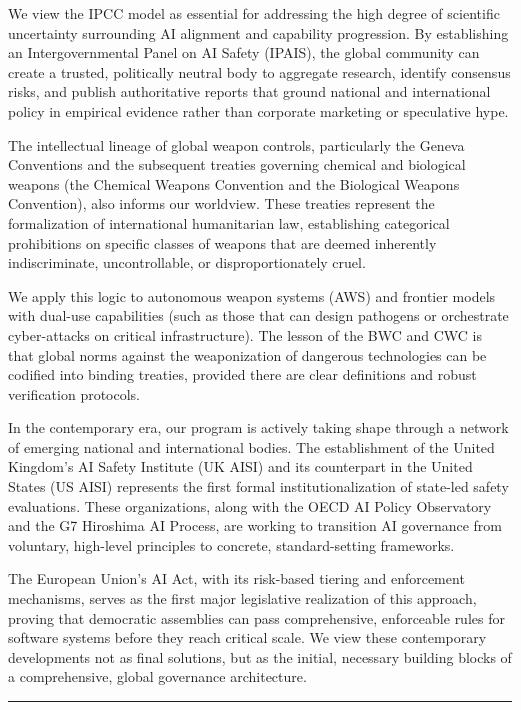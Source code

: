 We view the IPCC model as essential for addressing the high degree of
scientific uncertainty surrounding AI alignment and capability
progression. By establishing an Intergovernmental Panel on AI Safety
(IPAIS), the global community can create a trusted, politically neutral
body to aggregate research, identify consensus risks, and publish
authoritative reports that ground national and international policy in
empirical evidence rather than corporate marketing or speculative hype.

The intellectual lineage of global weapon controls, particularly the
Geneva Conventions and the subsequent treaties governing chemical and
biological weapons (the Chemical Weapons Convention and the Biological
Weapons Convention), also informs our worldview. These treaties
represent the formalization of international humanitarian law,
establishing categorical prohibitions on specific classes of weapons
that are deemed inherently indiscriminate, uncontrollable, or
disproportionately cruel.

We apply this logic to autonomous weapon systems (AWS) and frontier
models with dual-use capabilities (such as those that can design
pathogens or orchestrate cyber-attacks on critical infrastructure). The
lesson of the BWC and CWC is that global norms against the weaponization
of dangerous technologies can be codified into binding treaties,
provided there are clear definitions and robust verification protocols.

In the contemporary era, our program is actively taking shape through a
network of emerging national and international bodies. The establishment
of the United Kingdom's AI Safety Institute (UK AISI) and its
counterpart in the United States (US AISI) represents the first formal
institutionalization of state-led safety evaluations. These
organizations, along with the OECD AI Policy Observatory and the G7
Hiroshima AI Process, are working to transition AI governance from
voluntary, high-level principles to concrete, standard-setting
frameworks.

The European Union's AI Act, with its risk-based tiering and enforcement
mechanisms, serves as the first major legislative realization of this
approach, proving that democratic assemblies can pass comprehensive,
enforceable rules for software systems before they reach critical scale.
We view these contemporary developments not as final solutions, but as
the initial, necessary building blocks of a comprehensive, global
governance architecture.

\begin{center}\rule{0.5\linewidth}{0.5pt}\end{center}

